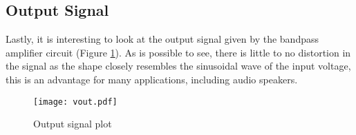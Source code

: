 \subsection{Output Signal}
\hspace{12pt} Lastly, it is interesting to look at the output signal given by the bandpass amplifier circuit (Figure \ref{fig:output_sim}). As is possible to see, there is little to no distortion in the signal as the shape closely resembles the sinusoidal wave of the input voltage, this is an advantage for many applications, including audio speakers.

\begin{figure}[h]
	\centering
	\texttt{[image: vout.pdf]}
	\caption{Output signal plot}
	\label{fig:output_sim}
\end{figure}

